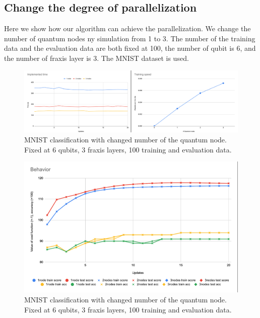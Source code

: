 \subsection{Change the degree of parallelization}
Here we show how our algorithm can achieve the parallelization. We change the number of quantum nodes ny simulation from 1 to 3. The number of the training data and the evaluation data are both fixed at 100, the number of qubit is 6, and the number of fraxis layer is 3. The MNIST dataset is used.
\begin{figure}[H]
    \centering
    \includegraphics[keepaspectratio, scale=0.54]{experiment/figure/MNIST_node_change_time.png}
    \caption{MNIST classification with changed number of the quantum node. Fixed at 6 qubits, 3 fraxis layers, 100 training and evaluation data.}
    \label{fig:MNIST_node_change_time}
\end{figure}
\begin{figure}[H]
    \centering
    \includegraphics[keepaspectratio, scale=0.54]{experiment/figure/MNIST_node_change_behavior.png}
    \caption{MNIST classification with changed number of the quantum node. Fixed at 6 qubits, 3 fraxis layers, 100 training and evaluation data.}
    \label{fig:MNIST_layer_change_behavior}
\end{figure}


